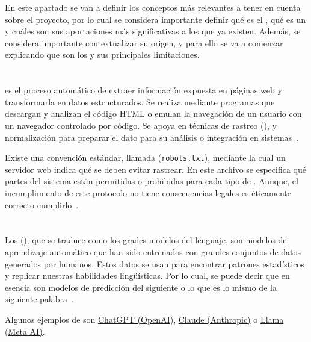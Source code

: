 
En este apartado se van a definir los conceptos más relevantes a tener en cuenta sobre el proyecto, por lo cual se considera importante definir qué es el , qué es un  y cuáles son sus aportaciones más significativas a los  que ya existen. Además, se considera importante contextualizar su origen, y para ello se va a comenzar explicando que son los  y sus principales limitaciones.

\section{}
 es el proceso automático de extraer información expuesta en páginas web y transformarla en datos estructurados. Se realiza mediante programas que descargan y analizan el código HTML o emulan la navegación de un usuario con un navegador controlado por código. Se apoya en técnicas de rastreo (),  y normalización para preparar el dato para su análisis o integración en sistemas~\cite{webScraping}.

Existe una convención estándar, llamada  (\texttt{robots.txt}), mediante la cual un servidor web indica qué  se deben evitar rastrear. En este archivo se especifica qué partes del sistema están permitidas o prohibidas para cada tipo de . Aunque, el incumplimiento de este protocolo no tiene consecuencias legales es éticamente correcto cumplirlo~\cite{rfc9309}. 

\section{}
Los  (), que se traduce como los grades modelos del lenguaje, son modelos de aprendizaje automático que han sido entrenados con grandes conjuntos de datos generados por humanos. Estos datos se usan para encontrar patrones estadísticos y replicar nuestras habilidades lingüísticas. Por lo cual, se puede decir que en esencia son modelos de predicción del siguiente  o lo que es lo mismo de la siguiente palabra~\cite{book:RAG_SimpleGuide}.

Algunos ejemplos de  son \href{https://chat.openai.com}{ChatGPT (OpenAI)}, \href{https://claude.ai}{Claude (Anthropic)} o \href{https://ai.meta.com/llama/}{Llama (Meta AI)}.

